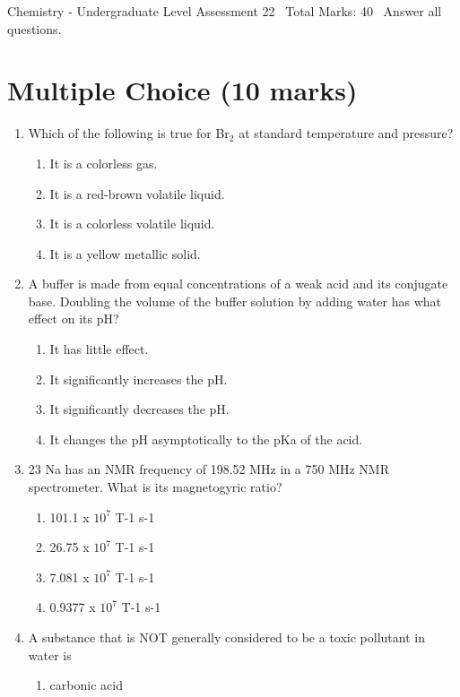 \documentclass[12pt]{article}
\begin{document}
\begin{center}
Chemistry - Undergraduate Level Assessment 22 \
Total Marks: 40 \
Answer all questions.
\end{center}

\section*{Multiple Choice (10 marks)}
\begin{enumerate}[label=\arabic*.]
\item Which of the following is true for Br$_{2}$ at standard temperature and pressure?
\begin{enumerate}[label=(\alph*)]
    \item It is a colorless gas.
    \item It is a red-brown volatile liquid.
    \item It is a colorless volatile liquid.
    \item It is a yellow metallic solid.
\end{enumerate}
\item A buffer is made from equal concentrations of a weak acid and its conjugate base. Doubling the volume of the buffer solution by adding water has what effect on its pH?
\begin{enumerate}[label=(\alph*)]
    \item It has little effect.
    \item It significantly increases the pH.
    \item It significantly decreases the pH.
    \item It changes the pH asymptotically to the pKa of the acid.
\end{enumerate}
\item 23 Na has an NMR frequency of 198.52 MHz in a 750 MHz NMR spectrometer. What is its magnetogyric ratio?
\begin{enumerate}[label=(\alph*)]
    \item 101.1 x $10^7$ T-1 s-1
    \item 26.75 x $10^7$ T-1 s-1
    \item 7.081 x $10^7$ T-1 s-1
    \item 0.9377 x $10^7$ T-1 s-1
\end{enumerate}
\item A substance that is NOT generally considered to be a toxic pollutant in water is
\begin{enumerate}[label=(\alph*)]
    \item carbonic acid

\end{enumerate}
\end{enumerate}
\end{document}
